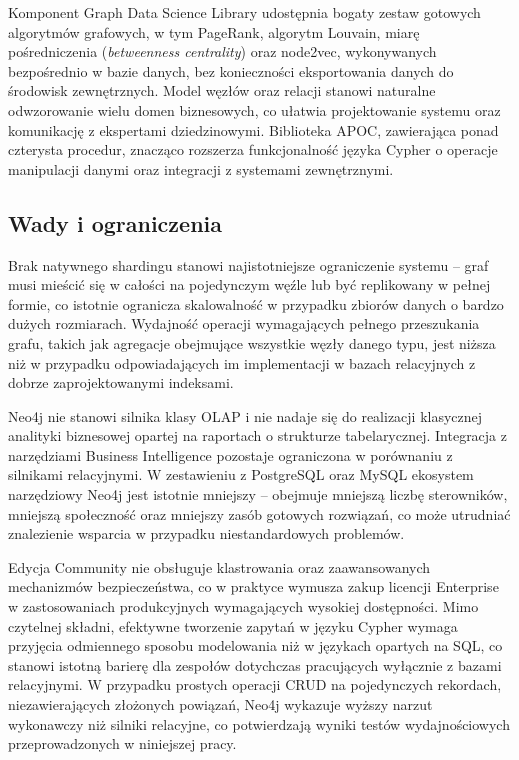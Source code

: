 Komponent Graph Data Science Library udostępnia bogaty zestaw gotowych
algorytmów grafowych, w tym PageRank, algorytm Louvain, miarę pośredniczenia
(\textit{betweenness centrality}) oraz node2vec, wykonywanych bezpośrednio
w bazie danych, bez konieczności eksportowania danych do środowisk
zewnętrznych. Model węzłów oraz relacji stanowi naturalne odwzorowanie wielu
domen biznesowych, co ułatwia projektowanie systemu oraz komunikację
z ekspertami dziedzinowymi. Biblioteka APOC, zawierająca ponad czterysta
procedur, znacząco rozszerza funkcjonalność języka Cypher o operacje
manipulacji danymi oraz integracji z systemami zewnętrznymi.

\subsection{Wady i ograniczenia}

Brak natywnego shardingu stanowi najistotniejsze ograniczenie systemu --
graf musi mieścić się w całości na pojedynczym węźle lub być replikowany
w pełnej formie, co istotnie ogranicza skalowalność w przypadku zbiorów
danych o bardzo dużych rozmiarach. Wydajność operacji wymagających pełnego
przeszukania grafu, takich jak agregacje obejmujące wszystkie węzły danego
typu, jest niższa niż w przypadku odpowiadających im implementacji w bazach
relacyjnych z dobrze zaprojektowanymi indeksami.

Neo4j nie stanowi silnika klasy OLAP i nie nadaje się do realizacji klasycznej
analityki biznesowej opartej na raportach o strukturze tabelarycznej. Integracja
z narzędziami Business Intelligence pozostaje ograniczona w porównaniu
z silnikami relacyjnymi. W zestawieniu z PostgreSQL oraz MySQL ekosystem
narzędziowy Neo4j jest istotnie mniejszy -- obejmuje mniejszą liczbę
sterowników, mniejszą społeczność oraz mniejszy zasób gotowych rozwiązań,
co może utrudniać znalezienie wsparcia w przypadku niestandardowych problemów.

Edycja Community nie obsługuje klastrowania oraz zaawansowanych mechanizmów
bezpieczeństwa, co w praktyce wymusza zakup licencji Enterprise w zastosowaniach
produkcyjnych wymagających wysokiej dostępności. Mimo czytelnej składni,
efektywne tworzenie zapytań w języku Cypher wymaga przyjęcia odmiennego
sposobu modelowania niż w językach opartych na SQL, co stanowi istotną
barierę dla zespołów dotychczas pracujących wyłącznie z bazami relacyjnymi.
W przypadku prostych operacji CRUD na pojedynczych rekordach, niezawierających
złożonych powiązań, Neo4j wykazuje wyższy narzut wykonawczy niż silniki
relacyjne, co potwierdzają wyniki testów wydajnościowych przeprowadzonych
w niniejszej pracy.

